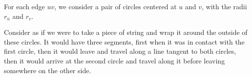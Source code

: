 \documentclass[paper=a4, fontsize=11pt]{scrartcl} %
\numberwithin{equation}{section} %
\numberwithin{figure}{section} %
\numberwithin{table}{section} %
\begin{document}
For each edge $uv$, we consider a pair of circles centered at
$u$ and $v$, with the radii $r_u$ and $r_v$.

Consider as if we were to take a piece of string and wrap it around
the outside of these circles.
It would have three segments,
first when it was in contact with the first circle,
then it would leave and travel along a line tangent to both circles,
then it would arrive at the second circle
and travel along it before leaving somewhere on the other side.




\end{document}
